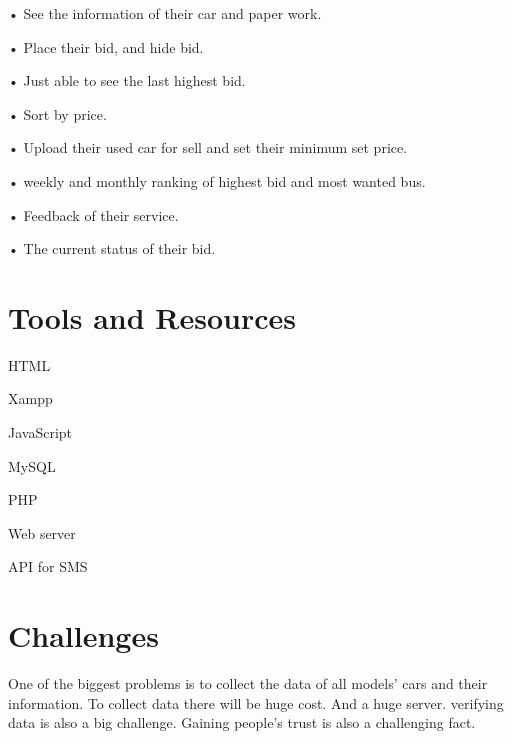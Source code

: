 \documentclass{report}
\begin{document}
•	See the information of their car and paper work.

•	Place their bid, and hide bid.

•	Just able to see the last highest bid.

•	Sort by price.

•	Upload their used car for sell and set their minimum set price.

•	weekly and monthly ranking of highest bid and most wanted bus.

•	Feedback of their service.

•	The current status of their bid.


\section{Tools and Resources}

	HTML
	
	Xampp
	
	JavaScript
	
	MySQL
	
	PHP
	
	Web server
	
	API for SMS

\section{Challenges}
One of the biggest problems is to collect the data of all models’ cars and their information. To collect data there will be huge cost. And a huge server. verifying data is also a big challenge. Gaining people’s trust is also a challenging fact.
\end{document}
